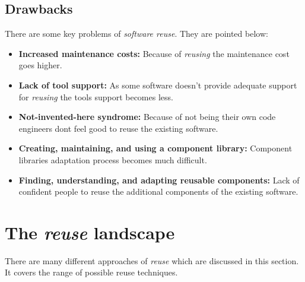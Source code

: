 \documentclass[dvips,12pt]{article}
\begin{document}
\subsection{Drawbacks}
There are some key problems of \emph{software reuse}. They are pointed below:
\begin{itemize}
\item \textbf{Increased maintenance costs:} Because of \emph{reusing} the maintenance cost goes higher.
\item \textbf{Lack of tool support:} As some software doesn't provide adequate support for \emph{reusing} the tools support becomes less.
\item \textbf{Not-invented-here syndrome:} Because of not being their own code engineers don\textquotesingle t feel good to reuse the existing software.
\item \textbf{Creating, maintaining, and using a component library:} Component libraries adaptation process becomes much difficult.
\item \textbf{Finding, understanding, and adapting reusable components:} Lack of confident people to reuse the additional components of the existing software. 
\end{itemize}

\section{The \emph{reuse} landscape}
There are many different approaches of \emph{reuse} which are discussed in this section. It covers the range of possible reuse techniques.
\end{document}
